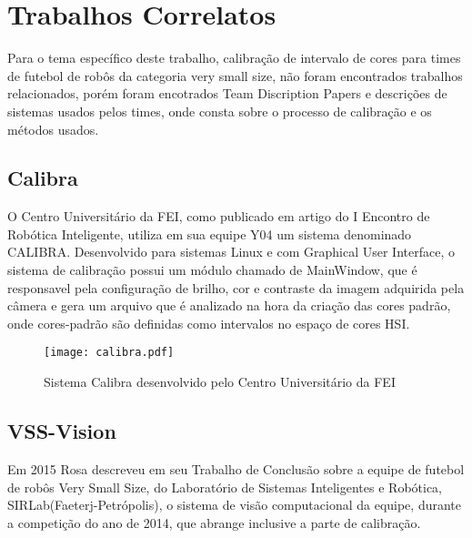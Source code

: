 \newpage

\section{Trabalhos Correlatos}
Para o tema específico deste trabalho, calibração de intervalo de cores para times de futebol de robôs da categoria very small size, não foram encontrados trabalhos relacionados, porém foram encotrados Team Discription Papers e descrições de sistemas usados pelos times, onde consta sobre o processo de calibração e os métodos usados.

\subsection{Calibra}
O Centro Universitário da FEI, como publicado em artigo do I Encontro de Robótica Inteligente\cite{PenharbelTime}, utiliza em sua equipe Y04 um sistema denominado CALIBRA\cite{Penharbel:2004}. Desenvolvido para sistemas Linux e com Graphical User Interface\cite{Penharbel:2004}, o sistema de calibração possui um módulo chamado de MainWindow, que é responsavel pela configuração de brilho, cor e contraste da imagem adquirida pela câmera e gera um arquivo que é analizado na hora da criação das cores padrão\cite{PenharbelTime}, onde cores-padrão são definidas como intervalos no espaço de cores HSI\cite{PenharbelTime}.
\begin{figure}[H]
	\centering
	\texttt{[image: calibra.pdf]}
	\caption{Sistema Calibra desenvolvido pelo Centro Universitário da FEI \cite{Penharbel:2004}}
	\label{Calibra}
\end{figure}

\subsection{VSS-Vision}

Em 2015 Rosa\cite{Rosa:2015} descreveu em seu Trabalho de Conclusão sobre a equipe de futebol de rob\^os Very Small Size, do Laboratório de Sistemas Inteligentes e Robótica, SIRLab(Faeterj-Petrópolis), o sistema de visão computacional da equipe, durante a competição do ano de 2014, que abrange inclusive a parte de calibração. 

